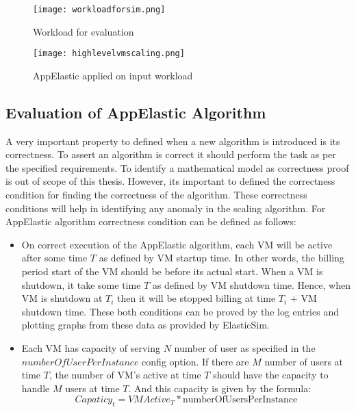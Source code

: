 \begin{figure}[h]
  \begin{center}
    \texttt{[image: workloadforsim.png]}
    \caption{Workload for evaluation}
    \label{figure:workloadforsim}
  \end{center}
\end{figure}
\begin{figure}[h]
  \begin{center}
    \texttt{[image: highlevelvmscaling.png]}
    \caption{AppElastic applied on input workload}
    \label{figure:appelasticapplication}
  \end{center}
\end{figure}
\subsection{Evaluation of AppElastic Algorithm}
\label{sub:Evaluation of AppElastic Algorithm}
A very important property to defined when a new algorithm is introduced is its correctness. To assert an algorithm is correct it should perform the task as per the specified requirements. To identify a mathematical model as correctness proof is out of scope of this thesis. However, its important to defined the correctness condition for finding the correctness of the algorithm. These correctness conditions will help in identifying any anomaly in the scaling algorithm. For AppElastic algorithm correctness condition can be defined as follows:
\begin{itemize}
  \item On correct execution of the AppElastic algorithm, each VM will be active after some time \(T\) as defined by VM startup time. In other words, the billing period start of the VM should be before its actual start. When a VM is shutdown, it take some time \(T\) as defined by VM shutdown time. Hence, when VM is shutdown at \(T_{i}\) then it will be stopped billing at time \(T_{i}\) + VM shutdown time. These both conditions can be proved by the log entries and plotting graphs from these data as provided by ElasticSim.
  \item Each VM has capacity of serving \(N\) number of user as specified in the \(numberOfUserPerInstance\) config option. If there are \(M\) number of users at time \(T\), the number of VM's active at time \(T\) should have the capacity to handle \(M\) users at time \(T\). And this capacity is given by the formula:
  \begin{equation}
    Capaticy_{t} = VM Active_{T} * \textrm{numberOfUsersPerInstance}
  \end{equation}
\end{itemize}
